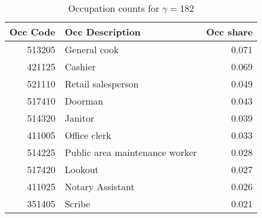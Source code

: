 \begin{table}
\centering
\caption{Occupation counts for $\gamma=$182}
\label{table:shock_case_study_AccomFood_most_shocked_gamma_occ_counts_47}
\begin{tabular}{rlr}
\toprule
Occ Code &                Occ Description & Occ share \\
\midrule
  513205 &                   General cook &     0.071 \\
  421125 &                        Cashier &     0.069 \\
  521110 &             Retail salesperson &     0.049 \\
  517410 &                        Doorman &     0.043 \\
  514320 &                        Janitor &     0.039 \\
  411005 &                   Office clerk &     0.033 \\
  514225 & Public area maintenance worker &     0.028 \\
  517420 &                        Lookout &     0.027 \\
  411025 &               Notary Assistant &     0.026 \\
  351405 &                         Scribe &     0.021 \\
\bottomrule
\end{tabular}
\end{table}
